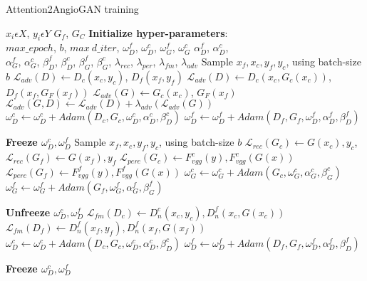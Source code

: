 \documentclass[a4paper,conference]{IEEEtran}
\begin{document}
\begin{algorithm}[h]
\caption{Attention2AngioGAN training}
\label{alg1}
\begin{algorithmic}[1]
 \renewcommand{\algorithmicrequire}{\textbf{Input:}}
 \renewcommand{\algorithmicensure}{\textbf{Output:}}
  \REQUIRE $x_{i} \epsilon X$, $y_{i} \epsilon {Y}$
 \ENSURE $G_{f}$, $G_{C}$
  \STATE \textbf{Initialize hyper-parameters}: \\$max\_epoch$, $b$, $max\ d\_iter$, $\omega^f_{D}$, $\omega^c_{D}$, $\omega^f_{G}$, $\omega^c_{G}$  $\alpha^f_{D}$, $\alpha^c_{D}$, \\  $\alpha^f_{G}$, $\alpha^c_{G}$, $\beta^f_{D}$, $\beta^c_{D}$, $\beta^f_{G}$,  $\beta^c_{G}$, $\lambda_{rec}$, $\lambda_{per}$, $\lambda_{fm}$, $\lambda_{adv}$ 
  \STATE Sample $x_{f},x_{c},y_{f},y_{c}$, using batch-size $b$ 
\STATE $\mathcal{L}_{adv}(D) \gets D_{c}(x_{c},y_{c})$, $D_{f}(x_{f},y_{f})$  
        \STATE $\mathcal{L}_{adv}(D) \gets D_{c}(x_{c},G_{c}(x_{c}))$, $D_{f}(x_{f},G_{F}(x_{f}))$  
        \STATE $\mathcal{L}_{adv}(G) \gets G_{c}(x_{c})$, $G_{F}(x_{f})$
        \STATE $\mathcal{L}_{adv}(G,D) \gets \mathcal{L}_{adv}(D) + \lambda_{adv}(\mathcal{L}_{adv}(G))$
        \STATE $\omega^c_{D} \gets \omega^c_{D}+ Adam(D_c,G_c,\omega^c_{D},\alpha^c_{D},\beta^c_{D})$
         \STATE $\omega^f_{D} \gets \omega^f_{D}+ Adam(D_f,G_f,\omega^f_{D},\alpha^f_{D},\beta^f_{D})$
    \ENDFOR
    \item[] \textbf{Freeze $\omega^c_{D},\omega^f_{D}$}
    \STATE Sample $x_{f},x_{c},y_{f},y_{c}$, using batch-size $b$
    \STATE $\mathcal{L}_{rec}(G_c) \gets G(x_{c}), y_{c}$,
    \STATE $\mathcal{L}_{rec}(G_f) \gets G(x_{f}),y_{f}$
    \STATE $\mathcal{L}_{perc}(G_c) \gets F_{vgg}^{c}(y), F_{vgg}^{c}(G(x))$
    \STATE $\mathcal{L}_{perc}(G_f) \gets F_{vgg}^{f}(y), F_{vgg}^{f}(G(x))$
    \STATE $\omega^c_{G} \gets \omega^c_{G}+ Adam(G_c,\omega^c_{G},\alpha^c_{G},\beta^c_{G})$
    \STATE $\omega^f_{G} \gets \omega^f_{G}+ Adam(G_f,\omega^f_{G},\alpha^f_{G},\beta^f_{G})$
    \item[] \textbf{Unfreeze $\omega^c_{D},\omega^f_{D}$}
    \STATE $\mathcal{L}_{fm}(D_c) \gets D^c_n(x_{c},y_{c}) , D^f_n(x_{c},G(x_{c})) $  
    \STATE $\mathcal{L}_{fm}(D_f) \gets D^f_n(x_{f},y_{f}) , D^f_n(x_{f},G(x_{f})) $
    \STATE $\omega^c_{D} \gets \omega^c_{D}+ Adam(D_c,G_c,\omega^c_{D},\alpha^c_{D},\beta^c_{D})$
    \STATE $\omega^f_{D} \gets \omega^f_{D}+ Adam(D_f,G_f,\omega^f_{D},\alpha^f_{D},\beta^f_{D})$
    \item[] \textbf{Freeze $\omega^c_{D},\omega^f_{D}$}

\end{algorithmic}
\end{algorithm}
\end{document}
